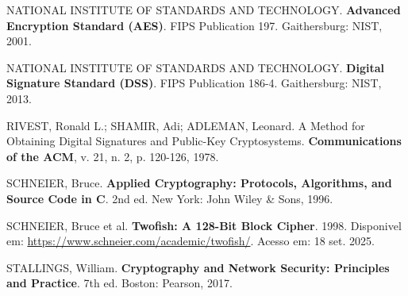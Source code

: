 \documentclass[12pt,a4paper,oneside]{article}
\begin{document}
NATIONAL INSTITUTE OF STANDARDS AND TECHNOLOGY. \textbf{Advanced Encryption Standard (AES)}. FIPS Publication 197. Gaithersburg: NIST, 2001.

NATIONAL INSTITUTE OF STANDARDS AND TECHNOLOGY. \textbf{Digital Signature Standard (DSS)}. FIPS Publication 186-4. Gaithersburg: NIST, 2013.

RIVEST, Ronald L.; SHAMIR, Adi; ADLEMAN, Leonard. A Method for Obtaining Digital Signatures and Public-Key Cryptosystems. \textbf{Communications of the ACM}, v. 21, n. 2, p. 120-126, 1978.

SCHNEIER, Bruce. \textbf{Applied Cryptography: Protocols, Algorithms, and Source Code in C}. 2nd ed. New York: John Wiley \& Sons, 1996.

SCHNEIER, Bruce et al. \textbf{Twofish: A 128-Bit Block Cipher}. 1998. Disponivel em: \url{https://www.schneier.com/academic/twofish/}. Acesso em: 18 set. 2025.

STALLINGS, William. \textbf{Cryptography and Network Security: Principles and Practice}. 7th ed. Boston: Pearson, 2017.
\end{document}
